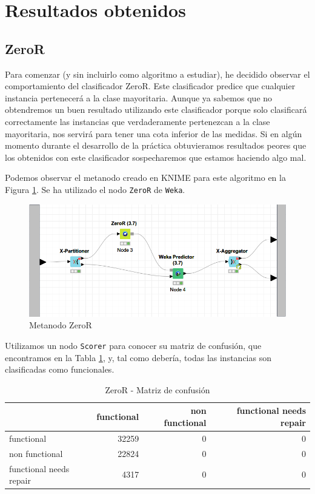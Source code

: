 \documentclass[a4paper, 20pt]{article}
\begin{document}
\section{Resultados obtenidos}
\subsection{ZeroR}
Para comenzar (y sin incluirlo como algoritmo a estudiar), he decidido observar el comportamiento del clasificador ZeroR. Este clasificador predice que cualquier instancia pertenecerá a la clase mayoritaria. Aunque ya sabemos que no obtendremos un buen resultado utilizando este clasificador porque solo clasificará correctamente las instancias que verdaderamente pertenezcan a la clase mayoritaria, nos servirá para tener una cota inferior de las medidas. Si en algún momento durante el desarrollo de la práctica obtuvieramos resultados peores que los obtenidos con este clasificador sospecharemos que estamos haciendo algo mal.

Podemos observar el metanodo creado en KNIME para este algoritmo en la Figura \ref{fig:zeroR}. Se ha utilizado el nodo \texttt{ZeroR} de \texttt{Weka}.

\begin{figure}[H]
    \centering
    \includegraphics[width=1\textwidth]{ZeroR}
    \caption{Metanodo ZeroR}
    \label{fig:zeroR}
\end{figure}

Utilizamos un nodo \texttt{Scorer} para conocer su matriz de confusión, que encontramos en la Tabla \ref{tab:CMZeroR}, y, tal como debería, todas las instancias son clasificadas como funcionales.

\begin{table}[H]
  \centering
  \caption{ZeroR - Matriz de confusión}
  \label{tab:CMZeroR}
  \begin{tabular}{lrrr}
    \toprule
    & functional & non functional & functional needs repair\\ \midrule
    functional & 32259 & 0 & 0\\
    non functional & 22824 & 0 & 0\\
    functional needs repair & 4317 & 0 & 0\\
    \bottomrule
  \end{tabular}
\end{table}
\end{document}

